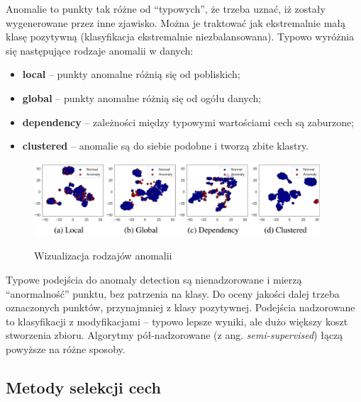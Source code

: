 \documentclass{myclass}
\numberwithin{equation}{section}
\begin{document}
Anomalie to punkty tak różne od \enquote{typowych}, że trzeba uznać, iż zostały wygenerowane przez
inne zjawisko. Można je traktować jak ekstremalnie małą klasę pozytywną (klasyfikacja ekstremalnie
niezbalansowana). Typowo wyróżnia się następujące rodzaje anomalii w danych:

\begin{itemize}
    
    \item \textbf{local} -- punkty anomalne różnią się od pobliskich;

    \item \textbf{global} -- punkty anomalne różnią się od ogółu danych;

    \item \textbf{dependency} -- zależności między typowymi wartościami cech są zaburzone;

    \item \textbf{clustered} -- anomalie są do siebie podobne i tworzą zbite klastry.
    
\end{itemize}

\begin{figure}[ht]
    \centering
    \includegraphics[width=0.95\textwidth]{figs/typesOfAnomalies.png}
    \label{fig:typesOfAnomalies}
    \caption{Wizualizacja rodzajów anomalii}
\end{figure}

Typowe podejścia do anomaly detection są nienadzorowane i mierzą \enquote{anormalność} punktu, bez
patrzenia na klasy. Do oceny jakości dalej trzeba oznaczonych punktów, przynajmniej z klasy
pozytywnej. Podejścia nadzorowane to klasyfikacji z modyfikacjami -- typowo lepsze wyniki, ale dużo
większy koszt stworzenia zbioru. Algorytmy pół-nadzorowane (z ang. \textit{semi-supervised}) łączą
powyższe na różne sposoby.


\subsection{Metody selekcji cech}
\end{document}
